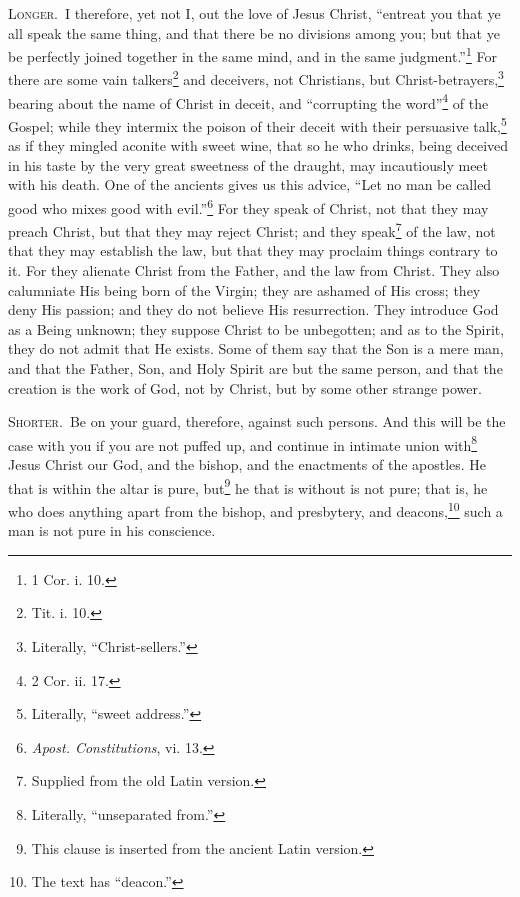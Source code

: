 \textsc{Longer.}~I therefore, yet not I, out the love of Jesus Christ, “entreat you that ye all speak the same thing, and that there be no divisions among you; but that ye be perfectly joined together in the same mind, and in the same judgment.”\footnote{1 Cor. i. 10.} For there are some vain talkers\footnote{Tit. i. 10.} and deceivers, not Christians, but Christ-betrayers,\footnote{Literally, “Christ-sellers.”} bearing about the name of Christ in deceit, and “corrupting the word”\footnote{2 Cor. ii. 17.} of the Gospel; while they intermix the poison of their deceit with their persuasive talk,\footnote{Literally, “sweet address.”} as if they mingled aconite with sweet wine, that so he who drinks, being deceived in his taste by the very great sweetness of the draught, may incautiously meet with his death. One of the ancients gives us this advice, “Let no man be called good who mixes good with evil.”\footnote{\emph{Apost. Constitutions}, vi. 13.} For they speak of Christ, not that they may preach Christ, but that they may reject Christ; and they speak\footnote{Supplied from the old Latin version.} of the law, not that they may establish the law, but that they may proclaim things contrary to it. For they alienate Christ from the Father, and the law from Christ. They also calumniate His being born of the Virgin; they are ashamed of His cross; they deny His passion; and they do not believe His resurrection. They introduce God as a Being unknown; they suppose Christ to be unbegotten; and as to the Spirit, they do not admit that He exists. Some of them say that the Son is a mere man, and that the Father, Son, and Holy Spirit are but the same person, and that the creation is the work of God, not by Christ, but by some other strange power.


\textsc{Shorter.}~Be on your guard, therefore, against such persons. And this will be the case with you if you are not puffed up, and continue in intimate union with\footnote{Literally, “unseparated from.”} Jesus Christ our God, and the  bishop, and the enactments of the apostles. He that is within the altar is pure, but\footnote{This clause is inserted from the ancient Latin version.} he that is without is not pure; that is, he who does anything apart from the bishop, and presbytery, and deacons,\footnote{The text has “deacon.”} such a man is not pure in his conscience.

